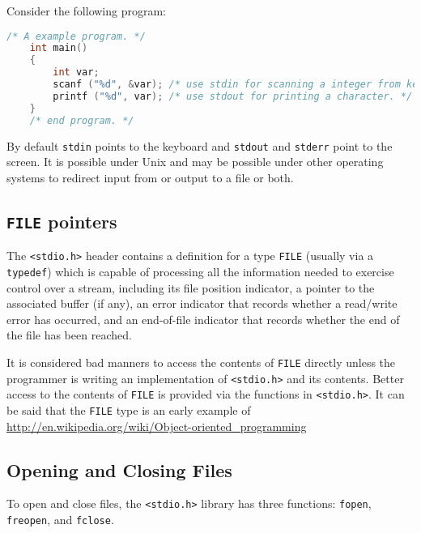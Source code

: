 Consider the following program:

\lstset{basicstyle=\scriptsize, numbers=left, captionpos=b, tabsize=4}
\begin{lstlisting}[caption=Section \thesection listing \arabic{filecnt},language={C},
breaklines=true,xleftmargin=15pt,label=lst:section\thesection listing\arabic{filecnt}]
	/* A example program. */
	int main()
	{
	    int var;
	    scanf ("%d", &var); /* use stdin for scanning a integer from keyboard. */
	    printf ("%d", var); /* use stdout for printing a character. */
	}
	/* end program. */
\end{lstlisting}

By default \texttt{stdin} points to the keyboard and \texttt{stdout} and
\texttt{stderr} point to the screen. It is possible under Unix and may be
possible under other operating systems to redirect input from or output to a
file or both.

\subsection{\texttt{FILE} pointers}
The \texttt{\textless{}stdio.h\textgreater{}} header contains a definition for
a type \texttt{FILE} (usually via a \texttt{typedef}) which is capable of
processing all the information needed to exercise control over a stream,
including its file position indicator, a pointer to the associated buffer (if
any), an error indicator that records whether a read/write error has occurred,
and an end-of-file indicator that records whether the end of the file has been
reached.

It is considered bad manners to access the contents of \texttt{FILE} directly
unless the programmer is writing an implementation of
\texttt{\textless{}stdio.h\textgreater{}} and its contents. Better access to
the contents of \texttt{FILE} is provided via the functions in
\texttt{\textless{}stdio.h\textgreater{}}. It can be said that the
\texttt{FILE} type is an early example of
\url{http://en.wikipedia.org/wiki/Object-oriented\_programming}

\subsection{Opening and Closing Files}
To open and close files, the \texttt{\textless{}stdio.h\textgreater{}} library
has three functions: \texttt{fopen}, \texttt{freopen}, and \texttt{fclose}.
